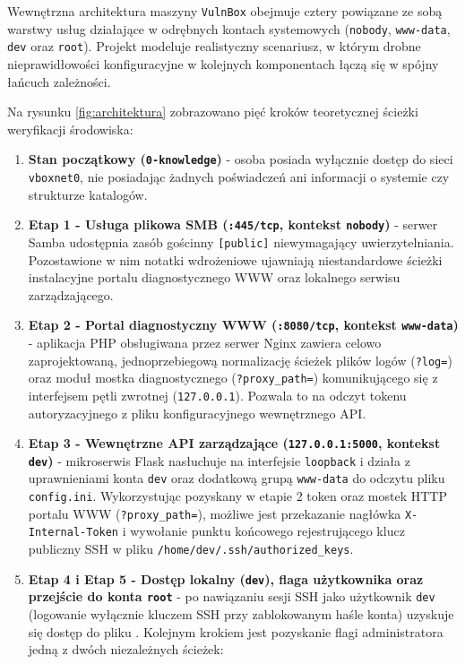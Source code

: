 Wewnętrzna architektura maszyny \texttt{VulnBox} obejmuje cztery powiązane ze sobą warstwy usług działające w odrębnych kontach systemowych (\texttt{nobody}, \texttt{www-data}, \texttt{dev} oraz \texttt{root}). Projekt modeluje realistyczny scenariusz, w którym drobne nieprawidłowości konfiguracyjne w kolejnych komponentach łączą się w spójny łańcuch zależności.


Na rysunku \ref{fig:architektura} zobrazowano pięć kroków teoretycznej ścieżki weryfikacji środowiska:
\begin{enumerate}
    \item \textbf{Stan początkowy (\texttt{0-knowledge})} - osoba posiada wyłącznie dostęp do sieci \texttt{vboxnet0}, nie posiadając żadnych poświadczeń ani informacji o systemie czy strukturze katalogów.
    \item \textbf{Etap 1 - Usługa plikowa SMB (\texttt{:445/tcp}, kontekst \texttt{nobody})} - serwer Samba udostępnia zasób gościnny \texttt{[public]} niewymagający uwierzytelniania. Pozostawione w nim notatki wdrożeniowe ujawniają niestandardowe ścieżki instalacyjne portalu diagnostycznego WWW oraz lokalnego serwisu zarządzającego.
    \item \textbf{Etap 2 - Portal diagnostyczny WWW (\texttt{:8080/tcp}, kontekst \texttt{www-data})} - aplikacja PHP obsługiwana przez serwer Nginx zawiera celowo zaprojektowaną, jednoprzebiegową normalizację ścieżek plików logów (\texttt{?log=}) oraz moduł mostka diagnostycznego (\texttt{?proxy\_path=}) komunikującego się z interfejsem pętli zwrotnej (\texttt{127.0.0.1}). Pozwala to na odczyt tokenu autoryzacyjnego z pliku konfiguracyjnego wewnętrznego API.
    \item \textbf{Etap 3 - Wewnętrzne API zarządzające (\texttt{127.0.0.1:5000}, kontekst \texttt{dev})} - mikroserwis Flask nasłuchuje na interfejsie \texttt{loopback} i działa z uprawnieniami konta \texttt{dev} oraz dodatkową grupą \texttt{www-data} do odczytu pliku \texttt{config.ini}. Wykorzystując pozyskany w etapie 2 token oraz mostek HTTP portalu WWW (\texttt{?proxy\_path=}), możliwe jest przekazanie nagłówka \texttt{X-Internal-Token} i wywołanie punktu końcowego rejestrującego klucz publiczny SSH w pliku \texttt{/home/dev/.ssh/authorized\_keys}.
    \item \textbf{Etap 4 i Etap 5 - Dostęp lokalny (\texttt{dev}), flaga użytkownika oraz przejście do konta \texttt{root}} - po nawiązaniu sesji SSH jako użytkownik \texttt{dev} (logowanie wyłącznie kluczem SSH przy zablokowanym haśle konta) uzyskuje się dostęp do pliku . Kolejnym krokiem jest pozyskanie flagi administratora  jedną z dwóch niezależnych ścieżek:

\end{enumerate}
